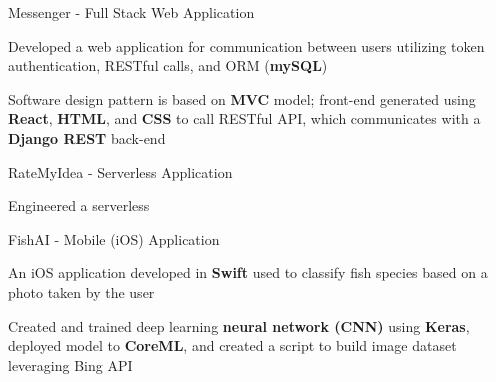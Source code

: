 \begin{siderulesProj}
\par\addvspace{-1.2ex}
\begin{cventriesproject}
  \cventryproject
    {Messenger - Full Stack Web Application}
    {
      \begin{cvskillitems}
        \item {Developed a web application for communication between users utilizing token authentication, RESTful calls, and ORM (\textbf{mySQL})}
        \item {Software design pattern is based on \textbf{MVC} model; front-end generated using \textbf{React}, \textbf{HTML}, and \textbf{CSS} to call RESTful API, which communicates with a \textbf{Django REST} back-end}
      \end{cvskillitems}
    }
  \cventryproject
    {RateMyIdea - Serverless Application}
    {
      \begin{cvskillitems}
        \item {Engineered a serverless }
        \item {}
      \end{cvskillitems}
    }
  \cventryproject
    {FishAI - Mobile (iOS) Application}
    {
      \begin{cvskillitems}
        \item {An iOS application developed in \textbf{Swift} used to classify fish species based on a photo taken by the user}
        \item {Created and trained deep learning \textbf{neural network (CNN)} using \textbf{Keras}, deployed model to \textbf{CoreML}, and created a script to build image dataset leveraging Bing API}
      \end{cvskillitems}
    }
\end{cventriesproject}
\end{siderulesProj}
